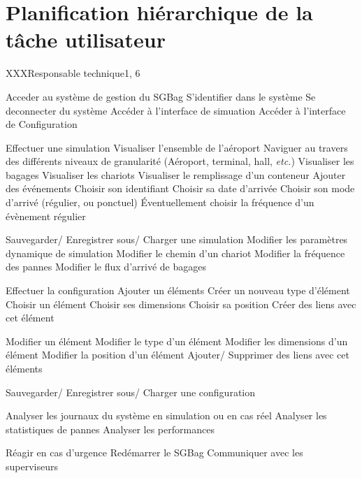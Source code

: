 \newpage
\part{Planification hiérarchique de la tâche utilisateur}

\phtu
{X}{XX}{Responsable technique}{1, 6}
{
\begin{tabular}
	\itm{} Acceder au système de gestion du SGBag
		\sitm{} S'identifier dans le système
		\sitm{} Se deconnecter du système
		\sitm{} Accéder à l'interface de simuation
		\sitm{} Accéder à l'interface de Configuration

	\itm{} Effectuer une simulation
		\sitm{} Visualiser l'ensemble de l'aéroport
			\ssitm{} Naviguer au travers des différents niveaux de granularité (Aéroport, terminal, hall, \textsl{etc.})
			\ssitm{} Visualiser les bagages
			\ssitm{} Visualiser les chariots
			\ssitm{} Visualiser le remplissage d'un conteneur
		\sitm{} Ajouter des événements
			\ssitm{} Choisir son identifiant
			\ssitm{} Choisir sa date d'arrivée
			\ssitm{} Choisir son mode d'arrivé (régulier, ou ponctuel)
			\ssitm{} Éventuellement choisir la fréquence d'un évènement régulier

		\sitm{} Sauvegarder/ Enregistrer sous/ Charger une simulation
		\sitm{} Modifier les paramètres dynamique de simulation
			\ssitm{} Modifier le chemin d'un chariot	
			\ssitm{} Modifier la fréquence des pannes
			\ssitm{} Modifier le flux d'arrivé de bagages
	
	\itm{} Effectuer la configuration
		\sitm{} Ajouter un éléments 
			\ssitm{} Créer un nouveau type d'élément
			\ssitm{} Choisir un élément
			\ssitm{} Choisir ses dimensions
			\ssitm{} Choisir sa position
			\ssitm{} Créer des liens avec cet élément

		\sitm{} Modifier un élément
			\ssitm{} Modifier le type d'un élément
			\ssitm{} Modifier les dimensions d'un élément
			\ssitm{} Modifier la position d'un élément
			\ssitm{} Ajouter/ Supprimer des liens avec cet éléments
		
		\sitm{} Sauvegarder/ Enregistrer sous/ Charger une configuration

	\itm{} Analyser les journaux du système en simulation ou en cas réel
		\sitm{} Analyser les statistiques de pannes
		\sitm{} Analyser les performances

	\itm{} Réagir en cas d'urgence 
		\sitm{} Redémarrer le SGBag
		\sitm{} Communiquer avec les superviseurs
		
\end{tabular}
}

